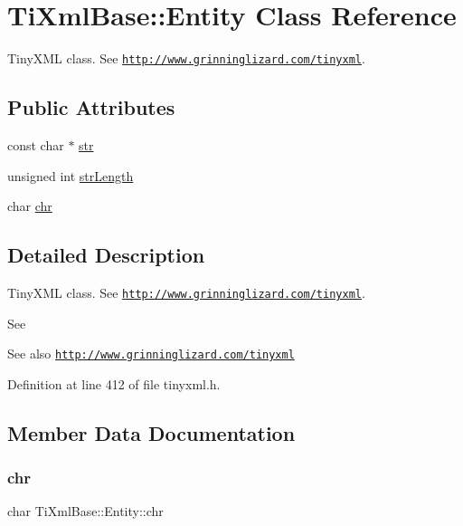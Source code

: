 \hypertarget{struct_ti_xml_base_1_1_entity}{}\section{Ti\+Xml\+Base\+:\+:Entity Class Reference}
\label{struct_ti_xml_base_1_1_entity}


Tiny\+X\+ML class. See \href{http://www.grinninglizard.com/tinyxml}{\tt http\+://www.\+grinninglizard.\+com/tinyxml}.  


\subsection*{Public Attributes}
\begin{DoxyCompactItemize}
\item 
const char $\ast$ \hyperlink{struct_ti_xml_base_1_1_entity_ab721b5d4f7ed144ffd215947b38258b7}{str}
\item 
unsigned int \hyperlink{struct_ti_xml_base_1_1_entity_a22e8d820894d3360b01fed110badb876}{str\+Length}
\item 
char \hyperlink{struct_ti_xml_base_1_1_entity_a2a7e1e68b93b4f76255c60c8fa7f738e}{chr}
\end{DoxyCompactItemize}


\subsection{Detailed Description}
Tiny\+X\+ML class. See \href{http://www.grinninglizard.com/tinyxml}{\tt http\+://www.\+grinninglizard.\+com/tinyxml}. 

See \begin{DoxySeeAlso}{See also}
\href{http://www.grinninglizard.com/tinyxml}{\tt http\+://www.\+grinninglizard.\+com/tinyxml} 
\end{DoxySeeAlso}


Definition at line 412 of file tinyxml.\+h.



\subsection{Member Data Documentation}
\hypertarget{struct_ti_xml_base_1_1_entity_a2a7e1e68b93b4f76255c60c8fa7f738e}{}\label{struct_ti_xml_base_1_1_entity_a2a7e1e68b93b4f76255c60c8fa7f738e} 
\subsubsection{\texorpdfstring{chr}{chr}}
{\footnotesize\ttfamily char Ti\+Xml\+Base\+::\+Entity\+::chr}




